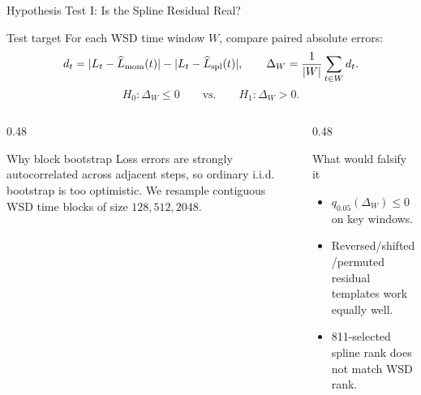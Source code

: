 \documentclass[fontset=fandol,aspectratio=169,10pt]{ctexbeamer}
\begin{document}
\begin{frame}{Hypothesis Test I: Is the Spline Residual Real?}
  \begin{block}{Test target}
    For each WSD time window \(W\), compare paired absolute errors:
    \[
      d_t=|L_t-\widehat L_{\rm mom}(t)|-|L_t-\widehat L_{\rm spl}(t)|,
      \qquad
      \Delta_W=\frac{1}{|W|}\sum_{t\in W}d_t.
    \]
    \[
      H_0:\Delta_W\le 0
      \qquad\text{vs.}\qquad
      H_1:\Delta_W>0.
    \]
  \end{block}

  \begin{columns}[T,onlytextwidth]
    \begin{column}{0.48\textwidth}
      \begin{block}{Why block bootstrap}
        Loss errors are strongly autocorrelated across adjacent steps, so ordinary i.i.d. bootstrap is too optimistic. We resample contiguous WSD time blocks of size \(128,512,2048\).
      \end{block}
    \end{column}
    \begin{column}{0.48\textwidth}
      \begin{block}{What would falsify it}
        \begin{itemize}
          \item \(q_{0.05}(\Delta_W)\le 0\) on key windows.
          \item Reversed/shifted/permuted residual templates work equally well.
          \item 811-selected spline rank does not match WSD rank.
        \end{itemize}
      \end{block}
    \end{column}
  \end{columns}
\end{frame}
\end{document}
